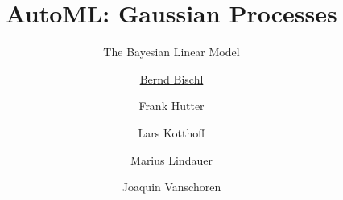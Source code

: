 




\newcommand{\lz}{\vspace{0.5cm}}
\newcommand{\thetab}{\bm{\weights}}
\newcommand{\zero}{\mathbf{0}}
\newcommand{\Xmat}{\mathbf{X}}
\newcommand{\ydat}{\mathbf{y}}
\newcommand{\id}{\boldsymbol{I}}
\newcommand{\Amat}{\mathbf{A}}




\title[AutoML: GPs]{AutoML: Gaussian Processes} %
\subtitle{The Bayesian Linear Model} %
\author[Marius Lindauer]{\underline{Bernd Bischl} \and Frank Hutter \and Lars Kotthoff\newline \and Marius Lindauer \and Joaquin Vanschoren}
\institute{}
\date{}





	
	\maketitle
	


